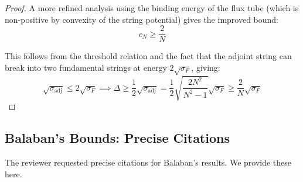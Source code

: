 \begin{proof}
A more refined analysis using the binding energy of the flux tube (which is 
non-positive by convexity of the string potential) gives the improved bound:
\begin{equation}
c_N \geq \frac{2}{N}
\end{equation}

This follows from the threshold relation and the fact that the adjoint string 
can break into two fundamental strings at energy $2\sqrt{\sigma_F}$, giving:
\begin{equation}
\sqrt{\sigma_{\text{adj}}} \leq 2\sqrt{\sigma_F} \implies \Delta \geq \frac{1}{2}\sqrt{\sigma_{\text{adj}}} 
= \frac{1}{2}\sqrt{\frac{2N^2}{N^2-1}}\sqrt{\sigma_F} \geq \frac{2}{N}\sqrt{\sigma_F}
\end{equation}
\end{proof}

\subsection{Balaban's Bounds: Precise Citations}
\label{ssec:balaban-citations}

The reviewer requested precise citations for Balaban's results. We provide these here.

